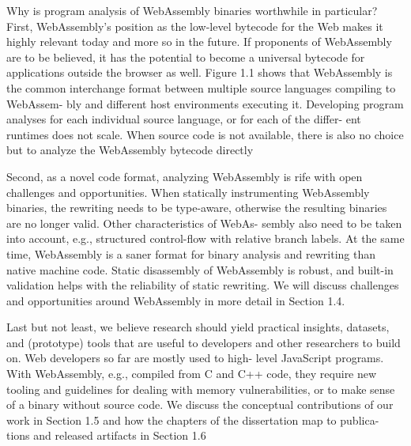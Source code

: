 {
    \color{red}
    Why is program analysis of WebAssembly binaries worthwhile in
particular? First, WebAssembly’s position as the low-level bytecode for
the Web makes it highly relevant today and more so in the future. If
proponents of WebAssembly are to be believed, it has the potential to
become a universal bytecode for applications outside the browser as
well. Figure 1.1 shows that WebAssembly is the common interchange
format between multiple source languages compiling to WebAssem-
bly and different host environments executing it. Developing program
analyses for each individual source language, or for each of the differ-
ent runtimes does not scale. When source code is not available, there
is also no choice but to analyze the WebAssembly bytecode directly

Second, as a novel code format, analyzing WebAssembly is rife with
open challenges and opportunities. When statically instrumenting WebAssembly binaries, the rewriting needs to be type-aware, otherwise the
resulting binaries are no longer valid. Other characteristics of WebAs-
sembly also need to be taken into account, e.g., structured control-flow
with relative branch labels. At the same time, WebAssembly is a saner
format for binary analysis and rewriting than native machine code.
Static disassembly of WebAssembly is robust, and built-in validation
helps with the reliability of static rewriting. We will discuss challenges
and opportunities around WebAssembly in more detail in Section 1.4.

Last but not least, we believe research should yield practical insights,
datasets, and (prototype) tools that are useful to developers and other
researchers to build on. Web developers so far are mostly used to high-
level JavaScript programs. With WebAssembly, e.g., compiled from C
and C++ code, they require new tooling and guidelines for dealing
with memory vulnerabilities, or to make sense of a binary without
source code. We discuss the conceptual contributions of our work in
Section 1.5 and how the chapters of the dissertation map to publica-
tions and released artifacts in Section 1.6
}


